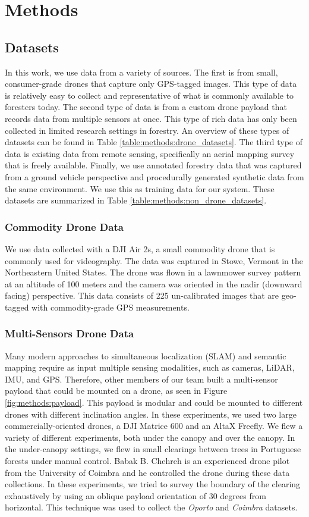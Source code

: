\chapter{Methods} \label{chapMethod}
\section{Datasets}
In this work, we use data from a variety of sources. The first is from small, consumer-grade drones that capture only GPS-tagged images. This type of data is relatively easy to collect and representative of what is commonly available to foresters today. The second type of data is from a custom drone payload that records data from multiple sensors at once. This type of rich data has only been collected in limited research settings in forestry. An overview of these types of datasets can be found in Table \ref{table:methods:drone_datasets}. The third type of data is existing data from remote sensing, specifically an aerial mapping survey that is freely available. Finally, we use annotated forestry data that was captured from a ground vehicle perspective and procedurally generated synthetic data from the same environment. We use this as training data for our system. These datasets are summarized in Table \ref{table:methods:non_drone_datasets}.

\subsection{Commodity Drone Data}
We use data collected with a DJI Air 2s, a small commodity drone that is commonly used for videography. The data was captured in Stowe, Vermont in the Northeastern United States. The drone was flown in a lawnmower survey pattern at an altitude of 100 meters and the camera was oriented in the nadir (downward facing) perspective. This data consists of 225 un-calibrated images that are geo-tagged with commodity-grade GPS measurements.

\subsection{Multi-Sensors Drone Data}
Many modern approaches to simultaneous localization (SLAM) and semantic mapping require as input multiple sensing modalities, such as cameras, LiDAR, IMU, and GPS. Therefore, other members of our team built a multi-sensor payload that could be mounted on a drone, as seen in Figure \ref{fig:methods:payload}. 
This payload is modular and could be mounted to different drones with different inclination angles. In these experiments, we used two large commercially-oriented drones, a DJI Matrice 600 and an AltaX Freefly. We flew a variety of different experiments, both under the canopy and over the canopy. In the under-canopy settings, we flew in small clearings between trees in Portuguese forests under manual control. Babak B. Chehreh is an experienced drone pilot from the University of Coimbra and he controlled the drone during these data collections. In these experiments, we tried to survey the boundary of the clearing exhaustively by using an oblique payload orientation of 30 degrees from horizontal. This technique was used to collect the \textit{Oporto} and \textit{Coimbra} datasets.

